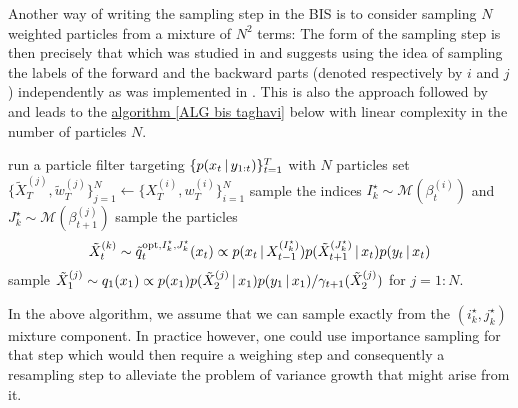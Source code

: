 Another way of writing the sampling step in the BIS is to consider sampling $N$ weighted particles from a mixture of $N^{2}$ terms:
The form of the sampling step is then precisely that which was studied in \cite{briers05} and suggests using the idea of sampling the labels of the forward and the backward parts (denoted respectively by $i$ and $j$) independently as was implemented in \citet{fearnhead10}. This is also the approach followed by \citet{taghavi12} and leads to the \hyperref[ALG bis taghavi]{algorithm \ref*{ALG bis taghavi}} below with linear complexity in the number of particles $N$.
\begin{algorithm}[!h]\small
	\caption{\label{ALG bis taghavi}}
	\begin{algorithmic}[1]
		\State run a particle filter targeting $\{p(x_{t}\,|\, y_{1:t})\}_{t=1}^{T}$ with $N$ particles
		\State set $\{\tilde X^{(j)}_{T},\tilde w^{(j)}_{T}\}_{j=1}^{N}\leftarrow \{X^{(i)}_{T},w^{(i)}_{T}\}_{i=1}^{N}$
	    			\State sample the indices $I^{\star}_{k} \sim \mathcal M(\beta^{(i)}_{t})$ and $J^{\star}_{k}\sim \mathcal M(\beta^{(j)}_{t+1})$
				\State sample the particles $$\tilde X^{(k)}_{t}\sim \tilde q_{t}^{\text{opt}, I^{\star}_{k}, J^{\star}_{k}}(x_{t}) \propto p(x_{t}\,|\, X^{(I^{\star}_{k})}_{t-1})p(\tilde X^{(J^{\star}_{k})}_{t+1}\,|\, x_{t})p(y_{t}\,|\, x_{t})$$
			\EndFor
		\EndFor
	\State sample $\tilde X^{(j)}_{1}\sim q_{1}(x_{1})\propto p(x_{1})p(\tilde X^{(j)}_{2}\,|\, x_{1})p(y_{1}\,|\, x_{1})/\gamma_{t+1}(\tilde X^{(j)}_{2})$ for $j=1:N$.
	\end{algorithmic}
\end{algorithm}

In the above algorithm, we assume that we can sample exactly from the $(i^{\star}_{k},j^{\star}_{k})$ mixture component. In practice however, one could use importance sampling for that step which would then require a weighing step and consequently a resampling step to alleviate the problem of variance growth that might arise from it.
